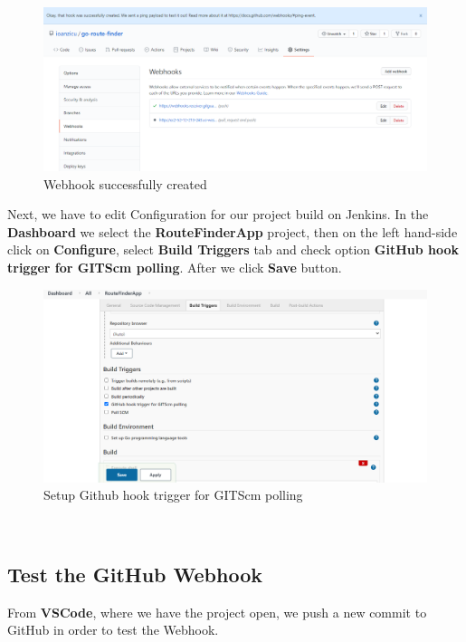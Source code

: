 \documentclass[12pt,a4paper,twoside]{article}
\begin{document}
\begin{figure}[H]
    \centering
        \includegraphics[width=15cm]{images-aws/45-web-hook-created.png}
        \caption{Webhook successfully created}
\end{figure}


Next, we have to edit Configuration for our project build on Jenkins. In the \textbf{Dashboard} we select the \textbf{RouteFinderApp} project, then on the left hand-side click on \textbf{Configure}, select \textbf{Build Triggers} tab and check option \textbf{GitHub hook trigger for GITScm polling}. After we click \textbf{Save} button.


\begin{figure}[H]
    \centering
        \includegraphics[width=15cm]{images-aws/46-trigger-jenkins.png}
        \caption{Setup Github hook trigger for GITScm polling}
\end{figure}




~\newpage


\subsection{Test the GitHub Webhook}


From \textbf{VSCode}, where we have the project open, we push a new commit to GitHub in order to test the Webhook.
\end{document}
